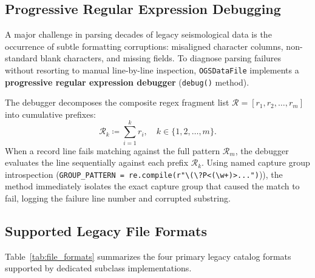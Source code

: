 \subsection{Progressive Regular Expression Debugging}
\label{subsec:progressive_regex_debugging}

A major challenge in parsing decades of legacy seismological data is
the occurrence of subtle formatting corruptions: misaligned
character columns, non-standard blank characters, and missing
fields. To diagnose parsing failures without resorting to manual
line-by-line inspection, \texttt{OGSDataFile} implements a
\textbf{progressive regular expression debugger} (\texttt{debug()} method).

The debugger decomposes the composite regex fragment list
$\mathcal{R} = [r_1, r_2, \dots, r_m]$ into cumulative prefixes:
\begin{equation}
  \mathcal{R}_k \coloneqq \sum_{i = 1}^k r_i, \quad k \in \{1, 2, \dots, m\}.
  \label{eq:regex_prefixes}
\end{equation}
When a record line fails matching against the full pattern
$\mathcal{R}_m$, the debugger evaluates the line sequentially
against each prefix $\mathcal{R}_k$. Using named capture group
introspection (\verb|GROUP_PATTERN = re.compile(r"\(\?P<(\w+)>...")|)),
the method immediately isolates
the exact capture group  that caused the match to fail, logging the
failure line number and corrupted substring.

\subsection{Supported Legacy File Formats}
\label{subsec:supported_formats}

Table~\ref{tab:file_formats} summarizes the four primary legacy
catalog formats supported by dedicated subclass implementations.

